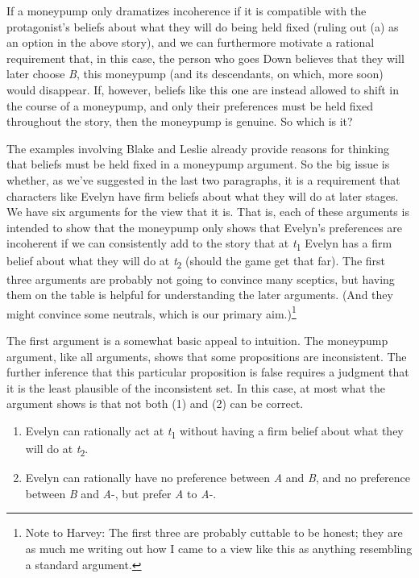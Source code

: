 \documentclass[
  11pt,
  letterpaper,
  DIV=11,
  numbers=noendperiod,
  twoside]{scrartcl}
\providecommand{\tightlist}{%
  \setlength{\itemsep}{0pt}\setlength{\parskip}{0pt}}
\begin{document}
If a moneypump only dramatizes incoherence if it is compatible with the
protagonist's beliefs about what they will do being held fixed (ruling
out (a) as an option in the above story), and we can furthermore
motivate a rational requirement that, in this case, the person who goes
Down believes that they will later choose \emph{B}, this moneypump (and
its descendants, on which, more soon) would disappear. If, however,
beliefs like this one are instead allowed to shift in the course of a
moneypump, and only their preferences must be held fixed throughout the
story, then the moneypump is genuine. So which is it?

The examples involving Blake and Leslie already provide reasons for
thinking that beliefs must be held fixed in a moneypump argument. So the
big issue is whether, as we've suggested in the last two paragraphs, it
is a requirement that characters like Evelyn have firm beliefs about
what they will do at later stages. We have six arguments for the view
that it is. That is, each of these arguments is intended to show that
the moneypump only shows that Evelyn's preferences are incoherent if we
can consistently add to the story that at \emph{t}\textsubscript{1}
Evelyn has a firm belief about what they will do at
\emph{t}\textsubscript{2} (should the game get that far). The first
three arguments are probably not going to convince many sceptics, but
having them on the table is helpful for understanding the later
arguments. (And they might convince some neutrals, which is our primary
aim.)\footnote{Note to Harvey: The first three are probably cuttable to
  be honest; they are as much me writing out how I came to a view like
  this as anything resembling a standard argument.}

The first argument is a somewhat basic appeal to intuition. The
moneypump argument, like all arguments, shows that some propositions are
inconsistent. The further inference that this particular proposition is
false requires a judgment that it is the least plausible of the
inconsistent set. In this case, at most what the argument shows is that
not both (1) and (2) can be correct.

\begin{enumerate}
\def\labelenumi{\arabic{enumi}.}
\tightlist
\item
  Evelyn can rationally act at \emph{t}\textsubscript{1} without having
  a firm belief about what they will do at \emph{t}\textsubscript{2}.
\item
  Evelyn can rationally have no preference between \emph{A} and
  \emph{B}, and no preference between \emph{B} and \emph{A}-, but prefer
  \emph{A} to \emph{A}-.
\end{enumerate}
\end{document}
